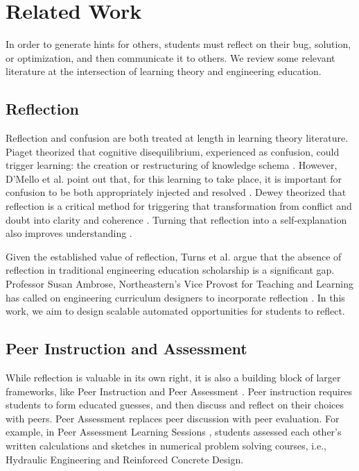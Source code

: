 \documentclass{sigchi}
\begin{document}
\section{Related Work}

In order to generate hints for others, students must reflect on their bug, solution, or optimization, and then communicate it to others. We review some relevant literature at the intersection of learning theory and engineering education.

\subsection{Reflection}
Reflection and confusion are both treated at length in learning theory literature. Piaget theorized that cognitive disequilibrium, experienced as confusion, could trigger learning: the creation or restructuring of knowledge schema \cite{disequilibrium}. However, D'Mello et al. point out that, for this learning to take place, it is important for confusion to be both appropriately injected and resolved \cite{productiveconfusion}. Dewey theorized that reflection is a critical method for triggering that transformation from conflict and doubt into clarity and coherence \cite{dewey1933}. Turning that reflection into a self-explanation also improves understanding \cite{selfexplanation}.

Given the established value of reflection, Turns et al. \cite{asee} argue that the absence of reflection in traditional engineering education scholarship is a significant gap. Professor Susan Ambrose, Northeastern's Vice Provost for Teaching and Learning has called on engineering curriculum designers to incorporate reflection \cite{ambrose}. In this work, we aim to design scalable automated opportunities for students to reflect.
\subsection{Peer Instruction and Assessment}
While reflection is valuable in its own right, it is also a building block of larger frameworks, like Peer Instruction \cite{mazur} and Peer Assessment \cite{peerassessment}. Peer instruction requires students to form educated guesses, and then discuss and reflect on their choices with peers. Peer Assessment replaces peer discussion with peer evaluation. For example, in Peer Assessment Learning Sessions \cite{pals}, students assessed each other's written calculations and sketches in numerical problem solving courses, i.e., Hydraulic Engineering and Reinforced Concrete Design. 
\end{document}
